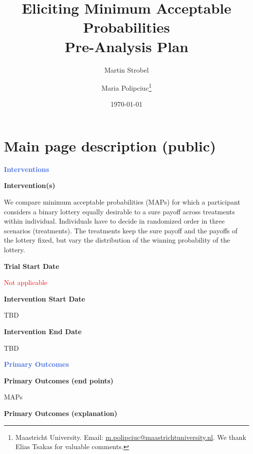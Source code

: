 \usepackage{preliminary}

\title{Eliciting Minimum Acceptable Probabilities \\
\Large Pre-Analysis Plan}
\author{Martin Strobel  \and Maria Polipciuc\thanks{Maastricht University. Email: \url{m.polipciuc@maastrichtuniversity.nl}. We thank Elias Tsakas for valuable comments.}}
\date{\today	\vspace{1cm}}
\titlepage



\begin{titlepage}
\clearpage\maketitle
\thispagestyle{empty}

\end{titlepage}
\section{Main page description (public)}
\large \textcolor{RoyalBlue}{\textbf{Interventions}}

\normalsize \noindent \textcolor{NavyBlue}{\textbf{Intervention(s)}}

We compare minimum acceptable probabilities (MAPs) for which a participant considers a binary lottery equally desirable to a sure payoff across treatments within individual.
Individuals have to decide in randomized order in three scenarios (treatments).
The treatments keep the sure payoff and the payoffs of the lottery fixed, but vary the distribution of the winning probability of the lottery.

\noindent \textcolor{NavyBlue}{\textbf{Trial Start Date}}

\textcolor{red}{Not applicable}

\noindent \textcolor{NavyBlue}{\textbf{Intervention Start Date}}

TBD

\noindent \textcolor{NavyBlue}{\textbf{Intervention End Date}}

TBD



\large \noindent \textcolor{RoyalBlue}{\textbf{Primary Outcomes}}

\normalsize \noindent \textcolor{NavyBlue}{\textbf{Primary Outcomes (end points)}}

MAPs

\noindent \textcolor{NavyBlue}{\textbf{Primary Outcomes (explanation)}}

